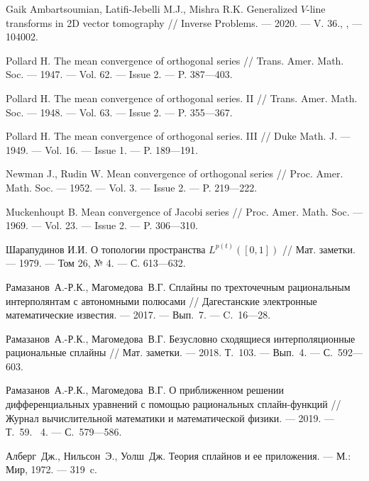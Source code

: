 \begin{thebibliography}{111}
Gaik Ambartsoumian, Latifi-Jebelli M.J., Mishra R.K.
Generalized $V$-line transforms in 2D vector tomography
//
Inverse Problems.
--- 2020.
--- V. 36., ,
--- 104002.
  
 Pollard H. The mean convergence of orthogonal series // Trans. Amer. Math. Soc.
--- 1947. --- Vol. 62. --- Issue 2. --- P. 387---403.

 Pollard H. The mean convergence of orthogonal series. II // Trans. Amer. Math. Soc.
--- 1948. --- Vol. 63. --- Issue 2. --- P. 355---367.

 Pollard H. The mean convergence of orthogonal series. III // Duke Math. J. --- 1949.
--- Vol. 16. --- Issue 1. --- P. 189---191.

 Newman J., Rudin W. Mean convergence of orthogonal series // Proc. Amer. Math.
Soc. --- 1952. --- Vol. 3. --- Issue 2. --- P. 219---222.

Muckenhoupt B. Mean convergence of Jacobi series // Proc. Amer. Math. Soc. --- 1969.
--- Vol. 23. --- Issue 2. --- P. 306---310.

 Шарапудинов И.И. О топологии пространства $L^{p(t)}([0,1])$ // Мат. заметки. --- 1979. --- Том 26, № 4. --- С. 613---632.





 
 Рамазанов~А.-Р.К., Магомедова~В.Г. Сплайны по трехточечным 
рациональным интерполянтам с автономными полюсами // Дагестанские электронные
 математические известия. --- 2017. --- Вып.~7. --- C.~16---28.

 Рамазанов~А.-Р.К., Магомедова~В.Г. Безусловно сходящиеся интерполяционные рациональные сплайны // Мат. заметки. --- 2018. Т.~103. --- Вып.~4. --- С.~592---603.

 Рамазанов~А.-Р.К., Магомедова~В.Г. О приближенном решении дифференциальных 
уравнений с помощью рациональных сплайн-функций // Журнал вычислительной математики и математической физики. --- 2019. --- Т.~59. \No~4. --- С.~579---586.

  Алберг~Дж., Нильсон~Э., Уолш~Дж. Теория сплайнов и ее приложения. --- М.: Мир, 1972. --- 319~c.


\end{thebibliography}
